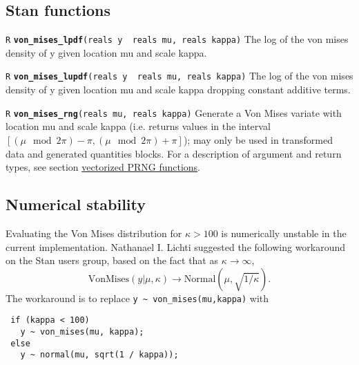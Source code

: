 \documentclass[
  10pt,
]{book}
\begin{document}
\hypertarget{stan-functions-46}{%
\subsection{Stan functions}\label{stan-functions-46}}


\texttt{R} \textbf{\texttt{von\_mises\_lpdf}}\texttt{(reals\ y\ \textbar{}\ reals\ mu,\ reals\ kappa)}\newline
The log of the von mises density of y given location mu and scale
kappa.


\texttt{R} \textbf{\texttt{von\_mises\_lupdf}}\texttt{(reals\ y\ \textbar{}\ reals\ mu,\ reals\ kappa)}\newline
The log of the von mises density of y given location mu and scale
kappa dropping constant additive terms.


\texttt{R} \textbf{\texttt{von\_mises\_rng}}\texttt{(reals\ mu,\ reals\ kappa)}\newline
Generate a Von Mises variate with location mu and scale kappa (i.e.
returns values in the interval \([(\mu \mod 2\pi)-\pi,(\mu \mod 2\pi)+\pi]\)); may only be used in transformed data and generated quantities
blocks. For a description of argument and return types, see section
\protect\hyperlink{prng-vectorization}{vectorized PRNG functions}.

\hypertarget{numerical-stability}{%
\subsection{Numerical stability}\label{numerical-stability}}

Evaluating the Von Mises distribution for \(\kappa > 100\) is
numerically unstable in the current implementation. Nathanael I.
Lichti suggested the following workaround on the Stan users group,
based on the fact that as \(\kappa \rightarrow \infty\), \[
\text{VonMises}(y|\mu,\kappa) \rightarrow \text{Normal}(\mu, \sqrt{1 /
\kappa}). \] The workaround is to replace \texttt{y\ \textasciitilde{}\ von\_mises(mu,kappa)}
with

\begin{verbatim}
 if (kappa < 100)
   y ~ von_mises(mu, kappa);
 else
   y ~ normal(mu, sqrt(1 / kappa));
\end{verbatim}
\end{document}

